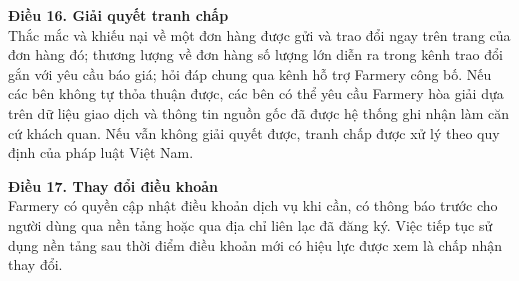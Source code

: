 \noindent\textbf{Điều 16. Giải quyết tranh chấp}\\
Thắc mắc và khiếu nại về một đơn hàng được gửi và trao đổi ngay trên trang
của đơn hàng đó; thương lượng về đơn hàng số lượng lớn diễn ra trong kênh
trao đổi gắn với yêu cầu báo giá; hỏi đáp chung qua kênh hỗ trợ Farmery công
bố. Nếu các bên không tự thỏa thuận được, các bên có thể yêu cầu Farmery hòa
giải dựa trên dữ liệu giao dịch và thông tin nguồn gốc đã được hệ thống ghi
nhận làm căn cứ khách quan. Nếu vẫn không giải quyết được, tranh chấp được xử
lý theo quy định của pháp luật Việt Nam.

\noindent\textbf{Điều 17. Thay đổi điều khoản}\\
Farmery có quyền cập nhật điều khoản dịch vụ khi cần, có thông báo trước cho
người dùng qua nền tảng hoặc qua địa chỉ liên lạc đã đăng ký. Việc tiếp tục
sử dụng nền tảng sau thời điểm điều khoản mới có hiệu lực được xem là chấp
nhận thay đổi.
